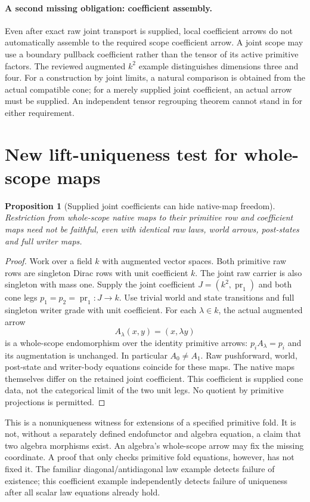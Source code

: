\documentclass[11pt]{article}
\newtheorem{proposition}{Proposition}\newtheorem{definition}[proposition]{Definition}
\begin{document}
\paragraph{A second missing obligation: coefficient assembly.} Even after exact raw joint transport is supplied, local coefficient arrows do not automatically assemble to the required scope coefficient arrow. A joint scope may use a boundary pullback coefficient rather than the tensor of its active primitive factors. The reviewed augmented $k^2$ example distinguishes dimensions three and four. For a construction by joint limits, a natural comparison is obtained from the actual compatible cone; for a merely supplied joint coefficient, an actual arrow must be supplied. An independent tensor regrouping theorem cannot stand in for either requirement.

\section{New lift-uniqueness test for whole-scope maps}
\begin{proposition}[Supplied joint coefficients can hide native-map freedom]
Restriction from whole-scope native maps to their primitive row and coefficient maps need not be faithful, even with identical raw laws, world arrows, post-states and full writer maps.
\end{proposition}
\begin{proof}
Work over a field $k$ with augmented vector spaces. Both primitive raw rows are singleton Dirac rows with unit coefficient $k$. The joint raw carrier is also singleton with mass one. Supply the joint coefficient $J=(k^2,\operatorname{pr}_1)$ and both cone legs $p_1=p_2=\operatorname{pr}_1:J\to k$. Use trivial world and state transitions and full singleton writer grade with unit coefficient. For each $\lambda\in k$, the actual augmented arrow
\[
 A_\lambda(x,y)=(x,\lambda y)
\]
is a whole-scope endomorphism over the identity primitive arrows: $p_iA_\lambda=p_i$ and its augmentation is unchanged. In particular $A_0\ne A_1$. Raw pushforward, world, post-state and writer-body equations coincide for these maps. The native maps themselves differ on the retained joint coefficient. This coefficient is supplied cone data, not the categorical limit of the two unit legs. No quotient by primitive projections is permitted.
\end{proof}

This is a nonuniqueness witness for extensions of a specified primitive fold. It is not, without a separately defined endofunctor and algebra equation, a claim that two algebra morphisms exist. An algebra's whole-scope arrow may fix the missing coordinate. A proof that only checks primitive fold equations, however, has not fixed it. The familiar diagonal/antidiagonal law example detects failure of existence; this coefficient example independently detects failure of uniqueness after all scalar law equations already hold.
\end{document}
